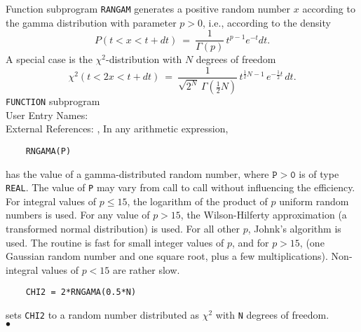                                
                 
\Submitter{}                                     
Function subprogram {\tt RANGAM} generates a positive random number
$x$ according to the gamma distribution with parameter $p>0$,
i.e., according to the density
$$ P(t < x < t+dt) \ = \
\displaystyle \frac{1}{\Gamma (p)}\, t^{p-1}e^{-t}dt. $$
A special case is the $\chi ^2$-distribution with $N$ degrees
of freedom
$$ \chi^2(t < 2x < t+dt) \ = \ \displaystyle
\frac{1}{\sqrt{2^N}\,\Gamma(\textstyle \frac{1}{2}N)}\,
t^{\frac{1}{2}N-1}\,e^{-\frac{1}{2}t}\,dt.$$
\Structure
{\tt FUNCTION} subprogram   \\
User Entry Names: \\
External References: , 
\Usage
In any arithmetic expression,
\begin{verbatim}
    RNGAMA(P)
\end{verbatim}
has the value of a gamma-distributed random number, where
$\mathtt{P > 0}$ is of type {\tt REAL}. The value of {\tt P} may
vary from call to call without influencing the efficiency.
\Method
For integral values of $p \le 15$, the logarithm of the product of
$p$ uniform random numbers is used. For any value of $p > 15$,
the Wilson-Hilferty approximation (a transformed normal distribution)
is used. For all other $p$, Johnk's algorithm is used.
\Notes
The routine is fast for small integer values of $p$,  and for $p > 15$,
(one Gaussian random number and one square root, plus a few
multiplications). Non-integral values of $p < 15$ are rather slow.
\Examples
\begin{verbatim}
    CHI2 = 2*RNGAMA(0.5*N)
\end{verbatim}
sets {\tt CHI2} to a random number distributed as $\chi ^2$ with
{\tt N} degrees of freedom.
\\ $\bullet$
